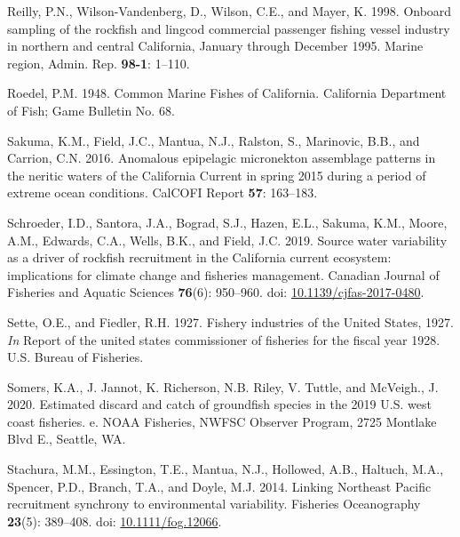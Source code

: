 \documentclass[
  english,
  a4paper,
]{article}
\newlength{\cslhangindent}
\newlength{\cslentryspacingunit} %
\newenvironment{CSLReferences}[2] %
 {%
  \setlength{\parindent}{0pt}
  \ifodd #1
  \let\oldpar\par
  \def\par{\hangindent=\cslhangindent\oldpar}
  \fi
  \setlength{\parskip}{#2\cslentryspacingunit}
 }%
 {}
\begin{document}
\begin{CSLReferences}{1}{0}
\leavevmode{}%
Reilly, P.N., Wilson-Vandenberg, D., Wilson, C.E., and Mayer, K. 1998. {Onboard sampling of the rockfish and lingcod commercial passenger fishing vessel industry in northern and central California, January through December 1995.} Marine region, Admin. Rep. \textbf{98-1}: 1--110.

\leavevmode{}%
Roedel, P.M. 1948. {Common Marine Fishes of California}. California Department of Fish; Game Bulletin No. 68.

\leavevmode{}%
Sakuma, K.M., Field, J.C., Mantua, N.J., Ralston, S., Marinovic, B.B., and Carrion, C.N. 2016. {Anomalous epipelagic micronekton assemblage patterns in the neritic waters of the California Current in spring 2015 during a period of extreme ocean conditions}. CalCOFI Report \textbf{57}: 163--183.

\leavevmode{}%
Schroeder, I.D., Santora, J.A., Bograd, S.J., Hazen, E.L., Sakuma, K.M., Moore, A.M., Edwards, C.A., Wells, B.K., and Field, J.C. 2019. {Source water variability as a driver of rockfish recruitment in the California current ecosystem: implications for climate change and fisheries management}. Canadian Journal of Fisheries and Aquatic Sciences \textbf{76}(6): 950--960. doi: \href{https://doi.org/10.1139/cjfas-2017-0480}{10.1139/cjfas-2017-0480}.

\leavevmode{}%
Sette, O.E., and Fiedler, R.H. 1927. {Fishery industries of the United States, 1927}. \emph{In} Report of the united states commissioner of fisheries for the fiscal year 1928. U.S. Bureau of Fisheries.

\leavevmode{}%
Somers, K.A., J. Jannot, K. Richerson, N.B. Riley, V. Tuttle, and McVeigh., J. 2020. {Estimated discard and catch of groundfish species in the 2019 U.S. west coast fisheries. e}. NOAA Fisheries, NWFSC Observer Program, 2725 Montlake Blvd E., Seattle, WA.

\leavevmode{}%
Stachura, M.M., Essington, T.E., Mantua, N.J., Hollowed, A.B., Haltuch, M.A., Spencer, P.D., Branch, T.A., and Doyle, M.J. 2014. {Linking Northeast Pacific recruitment synchrony to environmental variability}. Fisheries Oceanography \textbf{23}(5): 389--408. doi: \href{https://doi.org/10.1111/fog.12066}{10.1111/fog.12066}.


\end{CSLReferences}
\end{document}
